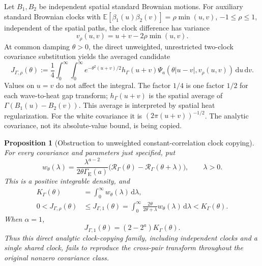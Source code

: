 \documentclass[12pt]{article}
\numberwithin{equation}{section}
\newtheorem{proposition}[theorem]{Proposition}
\theoremstyle{definition}
\newcommand{\E}{\mathbb{E}}
\newcommand{\ud}{\,\mathrm{d}}
\begin{document}
Let \(B_1,B_2\) be independent spatial standard Brownian motions.
For auxiliary standard Brownian clocks with
\(\E[\beta_1(u)\beta_2(v)]=\rho\min(u,v)\), \(-1\le\rho\le1\),
independent of the spatial paths, the clock difference has variance
\[
  v_\rho(u,v)=u+v-2\rho\min(u,v).
\]
At common damping \(\theta>0\), the direct unweighted, unrestricted
two-clock covariance substitution yields the averaged candidate
\begin{equation}\label{E:naive-clock-candidate}
  J_{\Gamma,\rho}(\theta)
  :=\frac14\int_0^\infty\int_0^\infty
  e^{-\theta^2(u+v)/2}h_\Gamma(u+v)
  \Psi_a(\theta|u-v|,v_\rho(u,v))\ud u\ud v .
\end{equation}
Values on \(u=v\) do not affect the integral.
The factor \(1/4\) is one factor \(1/2\) for each wave-to-heat gap
transform; \(h_\Gamma(u+v)\) is the spatial average of
\(\Gamma(B_1(u)-B_2(v))\).
This average is interpreted by spatial heat regularization.
For the white covariance it is \((2\pi(u+v))^{-1/2}\).
The analytic covariance, not its absolute-value bound, is being copied.

\begin{proposition}[Obstruction to unweighted constant-correlation clock copying]
  \label{P:clock-copy-obstruction}
  For every covariance and parameters just specified, put
  \begin{equation}\label{E:cross-clock-lambda-weight}
    w_\theta(\lambda)
    =\frac{\lambda^{a-2}}
    {2\theta\Gamma_{\mathrm E}(a)}
    \big(\mathcal R_\Gamma(\theta)
    -\mathcal R_\Gamma(\theta+\lambda)\big),\qquad\lambda>0.
  \end{equation}
  This is a positive integrable density, and
  \begin{equation}\label{E:clock-copy-obstruction}
    \begin{split}
      K_\Gamma(\theta)&=\int_0^\infty w_\theta(\lambda)\ud\lambda,\\
      0<J_{\Gamma,\rho}(\theta)
      &\le J_{\Gamma,1}(\theta)
      =\int_0^\infty
      \frac{2\theta}{2\theta+\lambda}w_\theta(\lambda)\ud\lambda
      <K_\Gamma(\theta).
    \end{split}
  \end{equation}
  When \(\alpha=1\),
  \begin{equation}\label{E:degree-one-clock-loss}
    J_{\Gamma,1}(\theta)=(2-2^a)K_\Gamma(\theta).
  \end{equation}
  Thus this direct analytic clock-copying family, including independent
  clocks and a single shared clock, fails to reproduce the cross-pair
  transform throughout the original nonzero covariance class.
\end{proposition}
\end{document}

